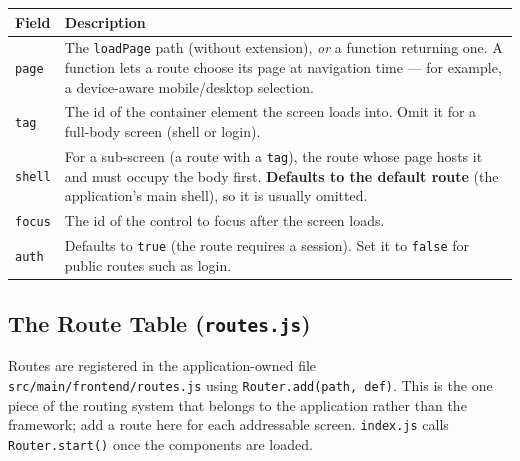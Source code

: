 \begin{longtable}{P{0.13\textwidth}P{0.79\textwidth}}
\toprule
\textbf{Field} & \textbf{Description} \\
\midrule
\endhead
\texttt{page} & The \texttt{loadPage} path (without extension), \emph{or} a function returning one.  A function lets a route choose its page at navigation time --- for example, a device-aware mobile/desktop selection. \\
\texttt{tag} & The id of the container element the screen loads into.  Omit it for a full-body screen (shell or login). \\
\texttt{shell} & For a sub-screen (a route with a \texttt{tag}), the route whose page hosts it and must occupy the body first.  \textbf{Defaults to the default route} (the application's main shell), so it is usually omitted. \\
\texttt{focus} & The id of the control to focus after the screen loads. \\
\texttt{auth} & Defaults to \texttt{true} (the route requires a session).  Set it to \texttt{false} for public routes such as login. \\
\bottomrule
\end{longtable}

\subsection{The Route Table (\texttt{routes.js})}
\label{sec:rs-routes-file}

Routes are registered in the application-owned file \texttt{src/main/frontend/routes.js} using \texttt{Router.add(path, def)}.  This is the one piece of the routing system that belongs to the application rather than the framework; add a route here for each addressable screen.  \texttt{index.js} calls \texttt{Router.start()} once the components are loaded.


